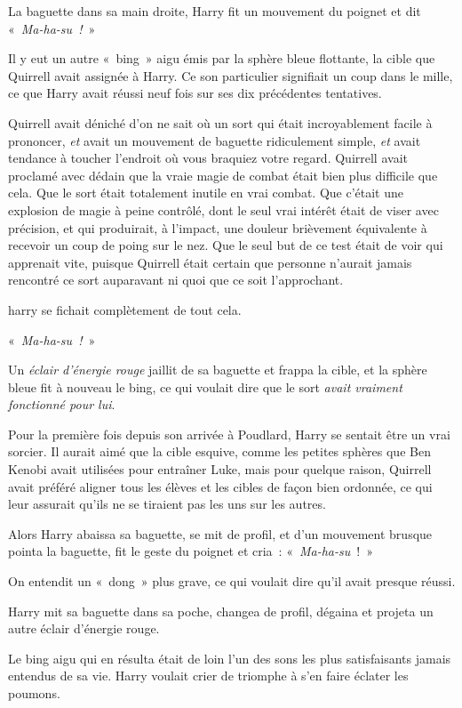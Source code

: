 \later

La baguette dans sa main droite, Harry fit un mouvement du poignet et dit «~\emph{Ma-ha-su~!}~»

Il y eut un autre «~bing~» aigu émis par la sphère bleue flottante, la cible que Quirrell avait assignée à Harry.
Ce son particulier signifiait un coup dans le mille, ce que Harry avait réussi neuf fois sur ses dix précédentes tentatives.

Quirrell avait déniché d'on ne sait où un sort qui était incroyablement facile à prononcer, \emph{et} avait un mouvement de baguette ridiculement simple, \emph{et} avait tendance à toucher l'endroit où vous braquiez votre regard.
Quirrell avait proclamé avec dédain que la vraie magie de combat était bien plus difficile que cela.
Que le sort était totalement inutile en vrai combat.
Que c'était une explosion de magie à peine contrôlé, dont le seul vrai intérêt était de viser avec précision, et qui produirait, à l'impact, une douleur brièvement équivalente à recevoir un coup de poing sur le nez.
Que le seul but de ce test était de voir qui apprenait vite, puisque Quirrell était certain que personne n'aurait jamais rencontré ce sort auparavant ni quoi que ce soit l'approchant.

harry se fichait complètement de tout cela.

«~\emph{Ma-ha-su~!}~»

Un \emph{éclair d'énergie rouge} jaillit de sa baguette et frappa la cible, et la sphère bleue fit à nouveau le bing, ce qui voulait dire que le sort \emph{avait vraiment fonctionné pour lui}.

Pour la première fois depuis son arrivée à Poudlard, Harry se sentait être un vrai sorcier.
Il aurait aimé que la cible esquive, comme les petites sphères que Ben Kenobi avait utilisées pour entraîner Luke, mais pour quelque raison, Quirrell avait préféré aligner tous les élèves et les cibles de façon bien ordonnée, ce qui leur assurait qu'ils ne se tiraient pas les uns sur les autres.

Alors Harry abaissa sa baguette, se mit de profil, et d'un mouvement brusque pointa la baguette, fit le geste du poignet et cria~: «~\emph{Ma-ha-su}~!~»

On entendit un «~dong~» plus grave, ce qui voulait dire qu'il avait presque réussi.

Harry mit sa baguette dans sa poche, changea de profil, dégaina et projeta un autre éclair d'énergie rouge.

Le bing aigu qui en résulta était de loin l'un des sons les plus satisfaisants jamais entendus de sa vie.
Harry voulait crier de triomphe à s'en faire éclater les poumons.

